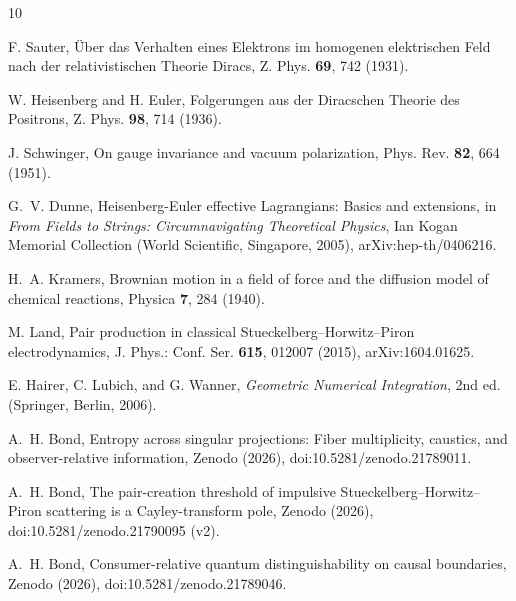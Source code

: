 \documentclass[aps,prd,reprint,nofootinbib,longbibliography]{revtex4-2}
\begin{document}
\begin{thebibliography}{10}

F. Sauter,
\"Uber das Verhalten eines Elektrons im homogenen elektrischen Feld
nach der relativistischen Theorie Diracs,
Z. Phys. \textbf{69}, 742 (1931).

W. Heisenberg and H. Euler,
Folgerungen aus der Diracschen Theorie des Positrons,
Z. Phys. \textbf{98}, 714 (1936).

J. Schwinger,
On gauge invariance and vacuum polarization,
Phys. Rev. \textbf{82}, 664 (1951).

G.~V. Dunne,
Heisenberg-Euler effective Lagrangians: Basics and extensions,
in \textit{From Fields to Strings: Circumnavigating Theoretical
Physics}, Ian Kogan Memorial Collection
(World Scientific, Singapore, 2005),
arXiv:hep-th/0406216.

H.~A. Kramers,
Brownian motion in a field of force and the diffusion model of
chemical reactions,
Physica \textbf{7}, 284 (1940).

M. Land,
Pair production in classical Stueckelberg--Horwitz--Piron
electrodynamics,
J. Phys.: Conf. Ser. \textbf{615}, 012007 (2015),
arXiv:1604.01625.

E. Hairer, C. Lubich, and G. Wanner,
\textit{Geometric Numerical Integration}, 2nd ed.
(Springer, Berlin, 2006).

A.~H. Bond,
Entropy across singular projections: Fiber multiplicity, caustics, and
observer-relative information,
Zenodo (2026), doi:10.5281/zenodo.21789011.

A.~H. Bond,
The pair-creation threshold of impulsive Stueckelberg--Horwitz--Piron
scattering is a Cayley-transform pole,
Zenodo (2026), doi:10.5281/zenodo.21790095 (v2).

A.~H. Bond,
Consumer-relative quantum distinguishability on causal boundaries,
Zenodo (2026), doi:10.5281/zenodo.21789046.

\end{thebibliography}
\end{document}
